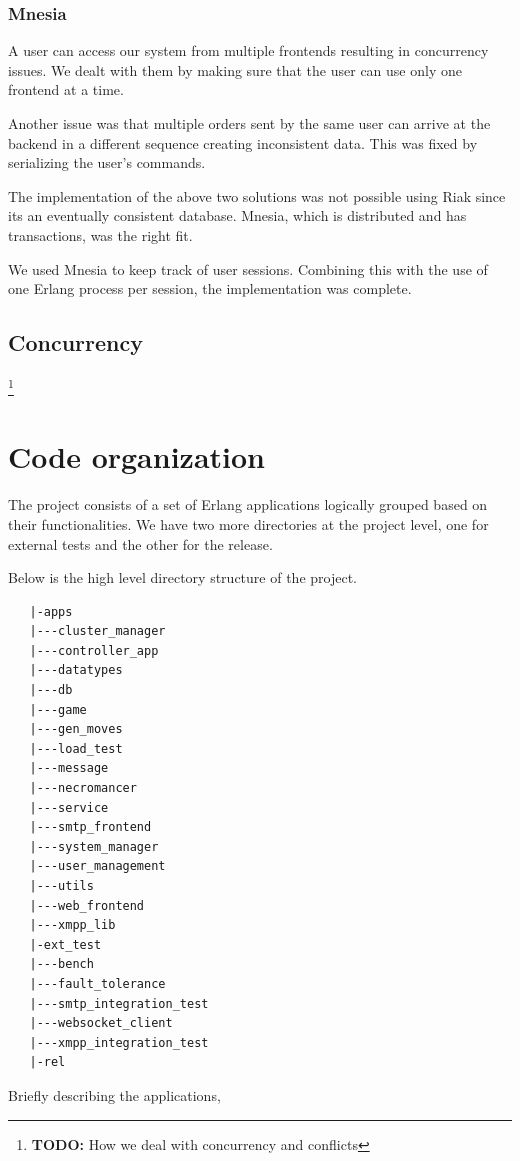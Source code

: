 \documentclass[11pt,a4paper]{report}
\newcommand{\todo}[1]{\footnote{{\color{red} {\bf TODO:} #1}}}
\begin{document}
\subsubsection{Mnesia}
A user can access our system from multiple frontends resulting in
concurrency issues. We dealt with them by making sure that the user
can use only one frontend at a time.

Another issue was that multiple orders sent by the same user can arrive at the
backend in a different sequence creating inconsistent data. This was
fixed by serializing the user's commands.

The implementation of the above two solutions was not possible using Riak since
its an eventually consistent database. Mnesia, which is distributed and has
transactions, was the right fit.

We used Mnesia to keep track of user sessions. Combining this with
the use of one Erlang process per session, the implementation was complete.

\subsection{Concurrency}
\label{sec:concurrency}
\todo{How we deal with concurrency and conflicts}

\section{Code organization}

The project consists of a set of Erlang applications logically grouped
based on their functionalities. We have two more directories at the
project level, one for external tests and the other for the release.

Below is the high level directory structure of the project.

\begin{verbatim}
   |-apps
   |---cluster_manager
   |---controller_app
   |---datatypes
   |---db
   |---game
   |---gen_moves
   |---load_test
   |---message
   |---necromancer
   |---service
   |---smtp_frontend
   |---system_manager
   |---user_management
   |---utils
   |---web_frontend
   |---xmpp_lib
   |-ext_test
   |---bench
   |---fault_tolerance
   |---smtp_integration_test
   |---websocket_client
   |---xmpp_integration_test
   |-rel
\end{verbatim}

Briefly describing the applications,
\end{document}
